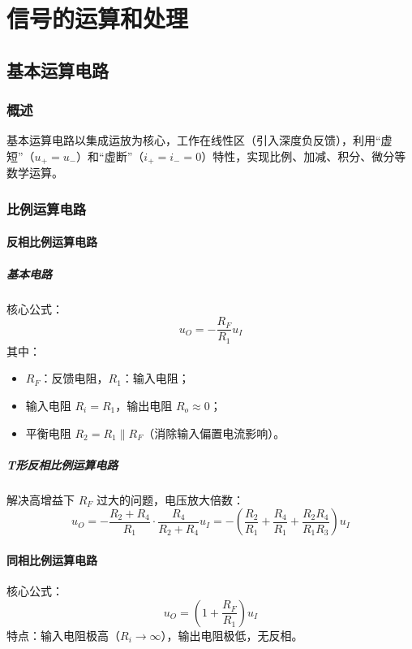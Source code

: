 \chapter{信号的运算和处理}

\section{基本运算电路}
\subsection{概述}
基本运算电路以集成运放为核心，工作在线性区（引入深度负反馈），利用“虚短”（$u_+ = u_-$）和“虚断”（$i_+ = i_- = 0$）特性，实现比例、加减、积分、微分等数学运算。

\subsection{比例运算电路}
\subsubsection{反相比例运算电路}
\paragraph{基本电路}
核心公式：
\[ u_O = -\frac{R_F}{R_1} u_I \]
其中：
\begin{itemize}
    \item $R_F$：反馈电阻，$R_1$：输入电阻；
    \item 输入电阻 $R_i = R_1$，输出电阻 $R_o \approx 0$；
    \item 平衡电阻 $R_2 = R_1 \parallel R_F$（消除输入偏置电流影响）。
\end{itemize}

\paragraph{T形反相比例运算电路}
解决高增益下 $R_F$ 过大的问题，电压放大倍数：
\[ u_O = -\frac{R_2 + R_4}{R_1} \cdot \frac{R_4}{R_2 + R_4} u_I = -\left( \frac{R_2}{R_1} + \frac{R_4}{R_1} + \frac{R_2 R_4}{R_1 R_3} \right) u_I \]

\subsubsection{同相比例运算电路}
核心公式：
\[ u_O = \left(1 + \frac{R_F}{R_1}\right) u_I \]
特点：输入电阻极高（$R_i \to \infty$），输出电阻极低，无反相。

